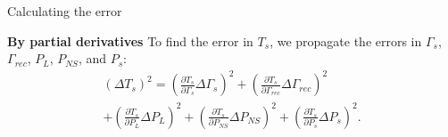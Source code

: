 \documentclass[aspectratio=169]{beamer}
\begin{document}
\begin{frame}{Calculating the error}

	\textbf{By partial derivatives}
	To find the error in \( T_s \), we propagate the errors in \( \Gamma_s \), \( \Gamma_{rec} \), \( P_L \), \( P_{NS} \), and \( P_s \):
	\begin{multline}
		(\Delta T_s)^2 = \left(\frac{\partial T_s}{\partial \Gamma_s} \Delta \Gamma_s\right)^2 + \left(\frac{\partial T_s}{\partial \Gamma_{rec}} \Delta \Gamma_{rec}\right)^2 \\ + \left(\frac{\partial T_s}{\partial P_L} \Delta P_L\right)^2 + \left(\frac{\partial T_s}{\partial P_{NS}} \Delta P_{NS}\right)^2 + \left(\frac{\partial T_s}{\partial P_s} \Delta P_s\right)^2.
	\end{multline}

\end{frame}
\end{document}
